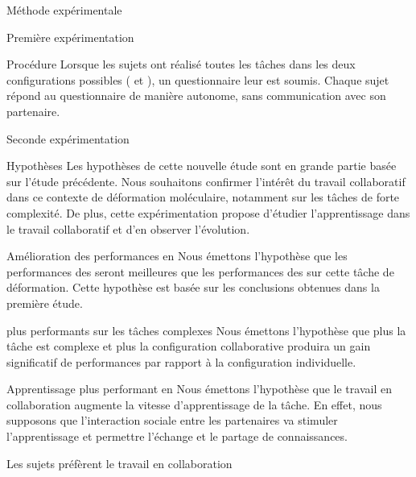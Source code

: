 \documentclass[myfrancais,ngerman,english,french]{mythesis}
\begin{document}
\begin{mychapter}{Méthode expérimentale}
\begin{mysection}{Première expérimentation}
\begin{mysubsection}{Procédure}
				Lorsque les sujets ont réalisé toutes les tâches dans les deux configurations possibles ( et ), un questionnaire leur est soumis.
				Chaque sujet répond au questionnaire de manière autonome, sans communication avec son partenaire.
			\end{mysubsection}
		\end{mysection}
		\begin{mysection}{Seconde expérimentation}
			\begin{mysubsection}{Hypothèses}
				Les hypothèses de cette nouvelle étude sont en grande partie basée sur l'étude précédente.
				Nous souhaitons confirmer l'intérêt du travail collaboratif dans ce contexte de déformation moléculaire, notamment sur les tâches de forte complexité.
				De plus, cette expérimentation propose d'étudier l'apprentissage dans le travail collaboratif et d'en observer l'évolution.
				\begin{myparagraph}{ Amélioration des performances en }
					Nous émettons l'hypothèse que les performances des  seront meilleures que les performances des  sur cette tâche de déformation.
					Cette hypothèse est basée sur les conclusions obtenues dans la première étude.
				\end{myparagraph}
				\begin{myparagraph}{  plus performants sur les tâches complexes}
					Nous émettons l'hypothèse que plus la tâche est complexe et plus la configuration collaborative produira un gain significatif de performances par rapport à la configuration individuelle.
				\end{myparagraph}
				\begin{myparagraph}{ Apprentissage plus performant en }
					Nous émettons l'hypothèse que le travail en collaboration augmente la vitesse d'apprentissage de la tâche.
					En effet, nous supposons que l'interaction sociale entre les partenaires va stimuler l'apprentissage et permettre l'échange et le partage de connaissances.
				\end{myparagraph}
				\begin{myparagraph}{ Les sujets préfèrent le travail en collaboration}

\end{myparagraph}
\end{mysubsection}
\end{mysection}
\end{mychapter}
\end{document}
